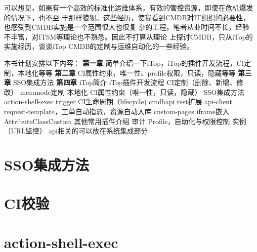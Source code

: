 \documentclass[fancyhdr,bookmark]{ctexbook}
\begin{document}
可以想见，如果有一个高效的标准化运维体系，有效的管控资源，即使在危机爆发的情况下，也不至
于那样狼狈。这些经历，使我看到CMDB对IT组织的必要性，也感受到CMDB实施是一个范围很大也很复
杂的工程。笔者从业时间不长，经验不丰富，对ITSM等理论也不熟悉。因此不打算从理论
上探讨CMDB，只从iTop的实施经历，谈谈iTop
CMDB的定制与运维自动化的一些经验。

本书计划安排以下内容： \textbf{第一章}
简单介绍一下iTop，iTop的插件开发流程，CI定制，本地化等等 \textbf{第二章}
CI属性约束，唯一性、profile权限，只读，隐藏等等 \textbf{第三章}
SSO集成方法 \textbf{第四章} iTop简介 iTop插件开发流程
CI定制（删除、新增、修改） menunode定制 本地化
CI属性约束（唯一性，只读，隐藏） SSO集成方法 action-shell-exec trigger
CI生命周期（lifecycle) cmdbapi rest扩展 api-client
request-template，工单自动指派，资源自动入库 custom-pages iframe嵌入
AttributeClassCustom 其他常用插件介绍 审计 Profile，自助化与权限控制
实例（URL监控） api相关的可以放在系统集成部分


{
\hypersetup{linkcolor=black}
\setcounter{tocdepth}{2}
\tableofcontents
{}
}
\listoftables
{}
\listoffigures
{}



\mainmatter
\chapter{SSO集成方法}\label{ssoux96c6ux6210ux65b9ux6cd5}

\chapter{CI校验}\label{ciux6821ux9a8c}

\chapter{action-shell-exec}\label{action-shell-exec}

\backmatter
\end{document}
